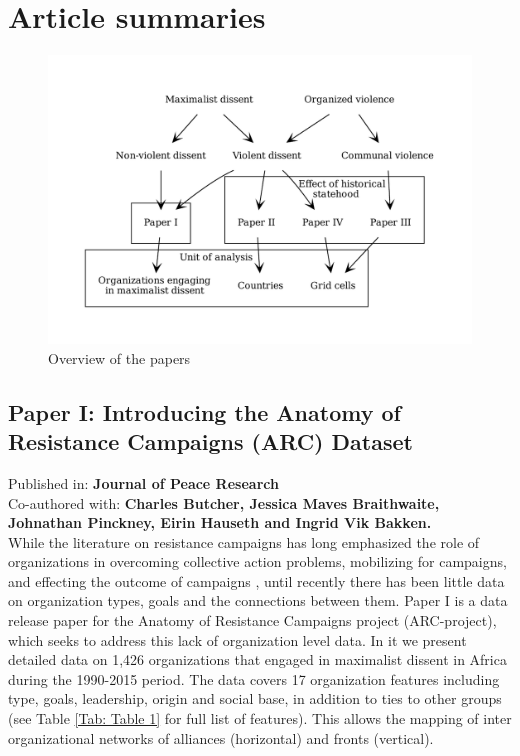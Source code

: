 \section{Article summaries} \label{Article summaries}

\begin{figure}[hpbt]
	\centering
	\includegraphics[width=\textwidth]{img/flow.pdf}
	\caption{Overview of the papers}
	\label{flow}
\end{figure}

\subsection{Paper I: Introducing the Anatomy of Resistance Campaigns (ARC) Dataset}
\label{Paper 1}

Published in: \textbf{Journal of Peace Research}\\
Co-authored with: \textbf{Charles Butcher, Jessica Maves Braithwaite,\\
	Johnathan Pinckney, Eirin Hauseth and Ingrid Vik Bakken.}\\

While the literature on resistance campaigns has long emphasized the role of
organizations in overcoming collective action problems, mobilizing for
campaigns, and effecting the outcome of campaigns \citep{Braithwaite2020,
	Brancati2016, Butcher_2014, Celestino_2013, chenoweth2011civil,
HaggardStephan2016DaD:, TarrowSidneyG.2011Pim:}, until recently there has been
little data on organization types, goals and the connections between them. Paper
I is a data release paper for the Anatomy of Resistance Campaigns project
(ARC-project), which seeks to address this lack of organization level data. In
it we present detailed data on 1,426 organizations that engaged in maximalist
dissent in Africa during the 1990-2015 period. The data covers 17 organization
features including type, goals, leadership, origin and social base, in addition
to ties to other groups (see Table \ref{Tab: Table 1} for full list of
features). This allows the mapping of inter organizational networks of alliances
(horizontal) and fronts (vertical).

